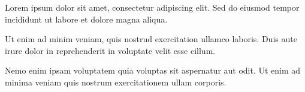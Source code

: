 \documentclass[a4paper, 10pt, twoside]{article}   %
\begin{document}


Lorem ipsum dolor sit amet, consectetur adipiscing elit.%
Sed do eiusmod tempor incididunt ut labore et dolore magna aliqua.

\smallskip
Ut enim ad minim veniam, quis nostrud exercitation ullamco laboris.%
Duis aute irure dolor in reprehenderit in voluptate velit esse cillum.

\smallskip
Nemo enim ipsam voluptatem quia voluptas sit aspernatur aut odit.%
Ut enim ad minima veniam quis nostrum exercitationem ullam corporis.
\end{document}
